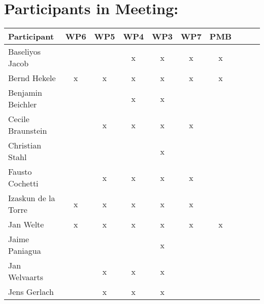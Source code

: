 \documentclass[a4paper, 11pt]{article}
\begin{document}
\section{Participants in Meeting:}

\begin{tabular}{|l|c|c|c||c|c|c||c|c|c|}
\hline
\textbf{Participant} & \textbf{WP6} &  \textbf{WP5} & \textbf{WP4}&  \textbf{WP3} & \textbf{WP7}&  \textbf{PMB} \\\hline
Baseliyos Jacob      &   &   & x & x & x & x \\\hline 
Bernd Hekele         & x & x & x & x & x & x \\\hline
Benjamin Beichler    &   &   & x & x &   &   \\\hline
Cecile Braunstein    &   & x & x & x & x &   \\\hline
Christian Stahl      &   &   &   & x &   &   \\\hline
Fausto Cochetti      &   & x & x & x & x &   \\\hline
Izaskun de la Torre  & x & x & x & x & x &   \\\hline
Jan Welte            & x & x & x & x & x & x \\\hline
Jaime Paniagua       &   &   &   & x &   &   \\\hline
Jan Welvaarts        &   & x & x & x &   &   \\\hline
Jens Gerlach         &   & x & x & x &   &   \\\hline

\end{tabular}
\end{document}
